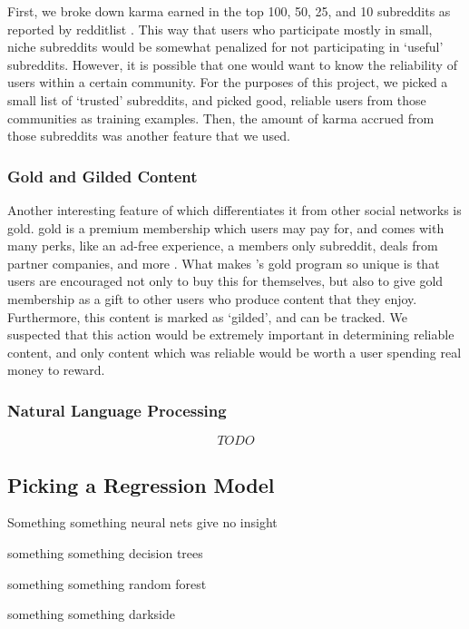 First, we broke down karma earned in the top 100, 50, 25, and 10 subreddits as
reported by redditlist \cite{redditlist}. This way that users who participate
mostly in small, niche subreddits would be somewhat penalized for not
participating in `useful' subreddits. However, it is possible that one would
want to know the reliability of users within a certain community. For the
purposes of this project, we picked a small list of `trusted' subreddits, and
picked good, reliable users from those communities as training examples. Then,
the amount of karma accrued from those subreddits was another feature that we
used.


\subsubsection{\reddit{} Gold and Gilded Content} %
\label{ssub:reddit_gold_and_gilded_content}

Another interesting feature of \reddit{} which differentiates it from other
social networks is \reddit{} gold. \reddit{} gold is a premium membership which
users may pay for, and comes with many perks, like an ad-free experience, a
members only subreddit, deals from partner companies, and more
\cite{redditgold}. What makes \reddit{}'s gold program so unique is that users
are encouraged not only to buy this for themselves, but also to give \reddit{}
gold membership as a gift to other users who produce content that they enjoy.
Furthermore, this content is marked as `gilded', and can be tracked. We
suspected that this action would be extremely important in determining reliable
content, and only content which was reliable would be worth a user spending real
money to reward.



\subsubsection{Natural Language Processing} %
\label{ssub:natural_language_processing}
\[TODO\]




\subsection{Picking a Regression Model} %
\label{sub:picking_a_regression_model}

Something something neural nets give no insight

something something decision trees

something something random forest

something something darkside

